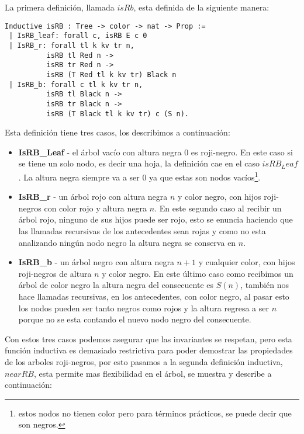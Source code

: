 \documentclass[letterpaper,12pt,oneside]{book}
\newcommand{\arns}{arboles roji-negros}
\theoremstyle{plain}
\theoremstyle{definition}
\theoremstyle{remark}
\begin{document}
La primera definici\'on, llamada $isRb$, esta definida de la siguiente manera: 
\begin{verbatim}
Inductive isRB : Tree -> color -> nat -> Prop :=
 | IsRB_leaf: forall c, isRB E c 0
 | IsRB_r: forall tl k kv tr n,
          isRB tl Red n ->
          isRB tr Red n ->
          isRB (T Red tl k kv tr) Black n
 | IsRB_b: forall c tl k kv tr n,
          isRB tl Black n ->
          isRB tr Black n ->
          isRB (T Black tl k kv tr) c (S n).
\end{verbatim}
Esta definici\'on tiene tres casos, los describimos a continuaci\'on:
\begin{itemize}
        \item \textbf{IsRB\_Leaf} - el árbol vacío con altura negra 0 es roji-negro. En este caso si se 
        tiene un solo nodo, es decir una hoja, la definici\'on cae en el caso $isRB_Leaf$. La altura 
        negra siempre va a ser 0 ya que estas son nodos vacíos\footnote{estos nodos no tienen color pero 
        para términos prácticos, se puede decir que son negros.}.
        \item \textbf{IsRB\_r} - un árbol rojo con altura negra $n$ y color negro, con hijos roji-negros
        con color rojo y altura negra $n$. En este segundo caso al recibir un \'arbol rojo, ninguno de 
        sus hijos puede ser rojo, esto se enuncia haciendo que las llamadas recursivas de los 
        antecedentes sean rojas y como no esta analizando ningún nodo negro la altura negra se conserva 
        en $n$.   
        \item \textbf{IsRB\_b} - un árbol negro con altura negra $n+1$ y cualquier color, con hijos
        roji-negros de altura $n$ y color negro. En este \'ultimo caso como recibimos un \'arbol de color
        negro la altura negra del consecuente es $S(n)$, también nos hace llamadas recursivas, en los 
        antecedentes, con color negro, al pasar esto los nodos pueden ser tanto negros como rojos y la 
        altura regresa a ser $n$ porque no se esta contando el nuevo nodo negro del consecuente.
\end{itemize}

Con estos tres casos podemos asegurar que las invariantes se respetan, pero esta funci\'on inductiva es 
demasiado restrictiva para poder demostrar las propiedades de los {\arns}, por esto pasamos a la segunda 
definici\'on inductiva, $nearRB$,  esta permite mas flexibilidad en el \'arbol, se muestra y describe a 
continuaci\'on:
\end{document}
